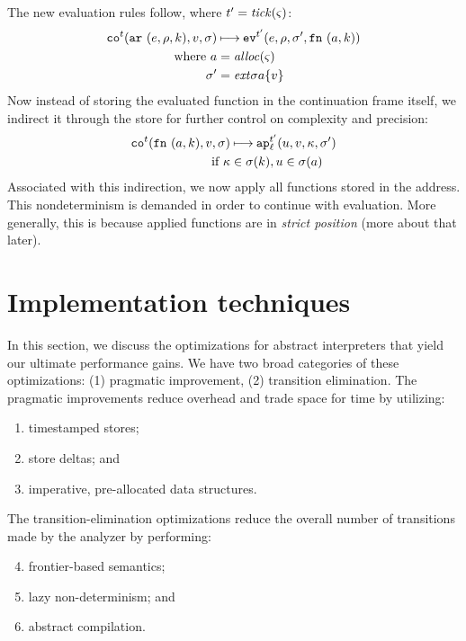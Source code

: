 \documentclass[preprint,onecolumn,9pt]{sigplanconf} %
\begin{document}
The new evaluation rules follow, where $\mcntr' = \tick(\mstate)$:
\begin{align*}
\co[^\mcntr]{\kar{\mexp,\menv,\mkaddr},\mval,\msto} & \machstep
\ev[^{\mcntr'}]{\mexp,\menv,\msto',\kfn{\maddr,\mkaddr}} \\
\text{ where }
  \maddr &= \alloc(\mstate) \\
  \msto' &= \ext{\msto}{\maddr}{\{\mval\}}
\end{align*}
Now instead of storing the evaluated function in the continuation
frame itself, we indirect it through the store for further control on
complexity and precision:
\begin{align*}
\co[^\mcntr]{\kfn{\maddr,\mkaddr},\mval,\msto} & \machstep
\ap[^{\mcntr'}_\mlab]{\mvalx{u},\mval,\mkont,\msto'}
\\
\text{ if } \mkont &\in \msto(\mkaddr), \mvalx{u} \in \msto(\maddr)
\end{align*}
Associated with this indirection, we now apply all functions stored in
the address. This nondeterminism is demanded in order to continue with
evaluation. More generally, this is because applied functions are in
\emph{strict position} (more about that later).



\section{Implementation techniques}
\label{sec:opt}

In this section, we discuss the optimizations for abstract interpreters that
yield our ultimate performance gains.
%
We have two broad categories of these optimizations: (1) pragmatic
improvement, (2) transition elimination.
%
The pragmatic improvements reduce overhead and trade space for time
by utilizing:
\begin{enumerate}
 \item timestamped stores;
 \item store deltas; and
 \item imperative, pre-allocated data structures.
\end{enumerate}
The transition-elimination optimizations reduce the overall number of transitions
made by the analyzer by performing:
\begin{enumerate}
  \setcounter{enumi}{3}
 \item frontier-based semantics;
 \item lazy non-determinism; and
 \item abstract compilation.
\end{enumerate}
\end{document}
